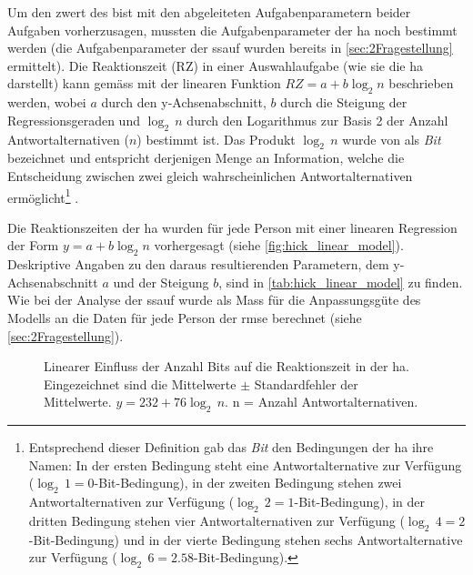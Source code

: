 \documentclass[11pt, twoside, a4paper]{book}		%
\begin{document}
Um den \gls{zwert} des \gls{bist} mit den abgeleiteten Aufgabenparametern beider Aufgaben vorherzusagen, mussten die Aufgabenparameter der \gls{ha} noch bestimmt werden (die Aufgabenparameter der \gls{ssauf} wurden bereits in \autoref{sec:2Fragestellung} ermittelt). 
Die Reaktionszeit (RZ) in einer Auswahlaufgabe (wie sie die \gls{ha} darstellt) kann gemäss \citet[S. 105]{Jensen1987a} mit der linearen Funktion $RZ=a+b\log_{2}n$ beschrieben werden, wobei $a$ durch den y-Achsenabschnitt, $b$ durch die Steigung der Regressionsgeraden und $\log_{2}\,n$ durch den Logarithmus zur Basis 2 der Anzahl Antwortalternativen ($n$) bestimmt ist.
Das Produkt $\log_{2}\,n$ wurde von \citet{Hick1952} als \textit{Bit} bezeichnet und entspricht derjenigen Menge an Information, welche die Entscheidung zwischen zwei gleich wahrscheinlichen Antwortalternativen ermöglicht\footnote{Entsprechend dieser Definition gab das \textit{Bit} den Bedingungen der \gls{ha} ihre Namen: In der ersten Bedingung steht eine Antwortalternative zur Verfügung ($\log_{2}\,1=0$-Bit-Bedingung), in der zweiten Bedingung stehen zwei Antwortalternativen zur Verfügung ($\log_{2}\,2=1$-Bit-Bedingung), in der dritten Bedingung stehen vier Antwortalternativen zur Verfügung ($\log_{2}\,4=2$-Bit-Bedingung) und in der vierte Bedingung stehen sechs Antwortalternative zur Verfügung ($\log_{2}\,6=2.58$-Bit-Bedingung).} \citep[siehe auch][S. 27]{Jensen2006}.

Die Reaktionszeiten der \gls{ha} wurden für jede Person mit einer linearen Regression der Form $y=a+b\log_{2}n$  vorhergesagt (siehe \autoref{fig:hick_linear_model}). Deskriptive Angaben zu den daraus resultierenden Parametern, dem y-Achsenabschnitt $a$ und der Steigung $b$, sind in \autoref{tab:hick_linear_model} zu finden. Wie bei der Analyse der \gls{ssauf} wurde als Mass für die Anpassungsgüte des Modells an die Daten für jede Person der \gls{rmse} berechnet (siehe \autoref{sec:2Fragestellung}).

\begin{figure}[htbp]
	\centering
	\begin{adjustbox}{width=1\textwidth}
		
	\end{adjustbox}
	\caption[Lineare Regression der \gls{ha}]{Linearer Einfluss der Anzahl Bits auf die Reaktionszeit in der \gls{ha}. Eingezeichnet sind die Mittelwerte $\pm$ Standardfehler der Mittelwerte. $y = 232 + 76\log_{2}\,n$. n = Anzahl Antwortalternativen.}
	\label{fig:hick_linear_model}
\end{figure}
\end{document}
